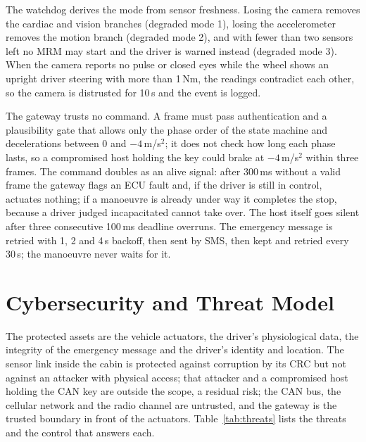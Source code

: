\documentclass[conference]{IEEEtran}
\begin{document}
The watchdog derives the mode from sensor freshness. Losing the camera removes the cardiac and vision branches (degraded mode 1), losing the accelerometer removes the motion branch (degraded mode 2), and with fewer than two sensors left no MRM may start and the driver is warned instead (degraded mode 3). When the camera reports no pulse or closed eyes while the wheel shows an upright driver steering with more than 1\,Nm, the readings contradict each other, so the camera is distrusted for 10\,s and the event is logged.

The gateway trusts no command. A frame must pass authentication and a plausibility gate that allows only the phase order of the state machine and decelerations between 0 and $-4$\,m/s$^2$; it does not check how long each phase lasts, so a compromised host holding the key could brake at $-4$\,m/s$^2$ within three frames. The command doubles as an alive signal: after 300\,ms without a valid frame the gateway flags an ECU fault and, if the driver is still in control, actuates nothing; if a manoeuvre is already under way it completes the stop, because a driver judged incapacitated cannot take over. The host itself goes silent after three consecutive 100\,ms deadline overruns. The emergency message is retried with 1, 2 and 4\,s backoff, then sent by SMS, then kept and retried every 30\,s; the manoeuvre never waits for it.

\section{Cybersecurity and Threat Model}
The protected assets are the vehicle actuators, the driver's physiological data, the integrity of the emergency message and the driver's identity and location. The sensor link inside the cabin is protected against corruption by its CRC but not against an attacker with physical access; that attacker and a compromised host holding the CAN key are outside the scope, a residual risk; the CAN bus, the cellular network and the radio channel are untrusted, and the gateway is the trusted boundary in front of the actuators. Table~\ref{tab:threats} lists the threats and the control that answers each.
\end{document}
